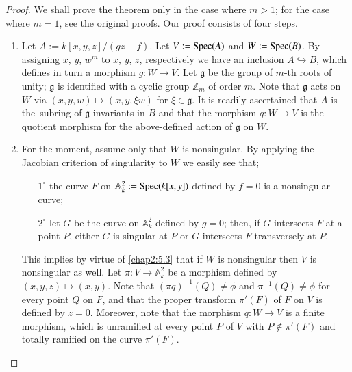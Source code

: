 \begin{proof}
We shall prove the theorem only in the case where $m>1$; for the case
where $m=1$, see the original proofs. Our proof consists of four
steps.
\begin{enumerate}
\renewcommand{\theenumi}{\Roman{enumi}}
\renewcommand{\labelenumi}{\rm(\theenumi)}
\item Let $A:=k[x,y,z]/(gz-f)$. Let $V:=\operatorname{Spec}(A)$ and
  $W:=\operatorname{Spec}(B)$. By assigning $x$, $y$, $w^{m}$ to $x$, $y$, $z$,
  respectively we have an inclusion $A\hookrightarrow B$, which
  defines in turn a morphism $g:W\to V$. Let $\mathfrak{g}$ be the
  group of $m$-th roots of unity; $\mathfrak{g}$ is identified with a
  cyclic group $\mathbb{Z}_{m}$ of order $m$. Note that $\mathfrak{g}$
  acts on $W$ via $(x,y,w)\mapsto (x,y,\xi w)$ for
  $\xi\in\mathfrak{g}$. It is readily ascertained that $A$ is
  the\pageoriginale\ subring of $\mathfrak{g}$-invariants in $B$ and
  that the morphism $q:W\to V$ is the quotient morphism for the
  above-defined action of $\mathfrak{g}$ on $W$.

\item For the moment, assume only that $W$ is nonsingular. By applying
  the Jacobian criterion of singularity to $W$ we easily see that;
\begin{itemize}
\item[$1^{\circ}$] the curve $F$ on
  $\mathbb{A}^{2}_{k}:=\operatorname{Spec}(k[x,y])$ defined by $f=0$ is a
  nonsingular curve;

\item[$2^{\circ}$] let $G$ be the curve on $\mathbb{A}^{2}_{k}$
  defined by $g=0$; then, if $G$ intersects $F$ at a point $P$, either
  $G$ is singular at $P$ or $G$ intersects $F$ transversely at $P$.
\end{itemize}
This implies by virtue of \ref{chap2:5.3} that if $W$ is nonsingular then
$V$ is nonsingular as well. Let $\pi:V\to \mathbb{A}^{2}_{k}$ be a
morphism defined by $(x,y,z)\mapsto (x,y)$. Note that $(\pi
q)^{-1}(Q)\neq \phi$ and $\pi^{-1}(Q)\neq \phi$ for every point $Q$ on
$F$, and that the proper transform $\pi'(F)$ of $F$ on $V$ is defined
by $z=0$. Moreover, note that the morphism $q:W\to V$ is a finite
morphism, which is unramified at every point $P$ of $V$ with $P\not\in
\pi'(F)$ and totally ramified on the curve $\pi'(F)$.


\end{enumerate}
\end{proof}
